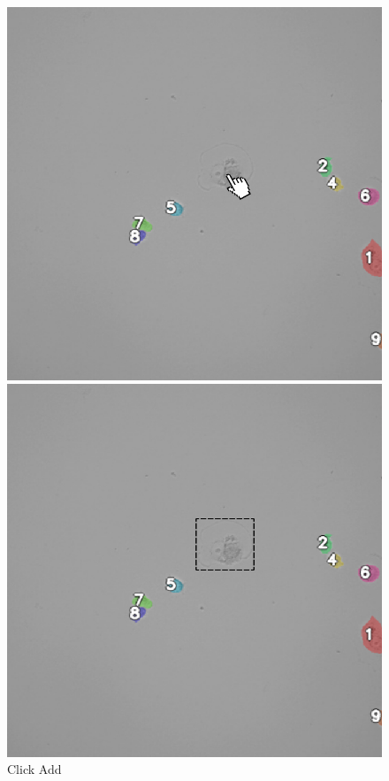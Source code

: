 \documentclass[../cellseek_paper.tex]{subfiles}
\begin{document}
\begin{figure}[H]
  \centering
  \begin{minipage}[b]{0.32\textwidth}
    \centering
    \includegraphics[width=\textwidth]{images/click_on_cell.jpg}
    \caption*{Click Add}
  \end{minipage}
  \hfill
  \begin{minipage}[b]{0.32\textwidth}
    \centering
    \includegraphics[width=\textwidth]{images/box_on_cell.jpg}

\end{minipage}
\end{figure}
\end{document}

